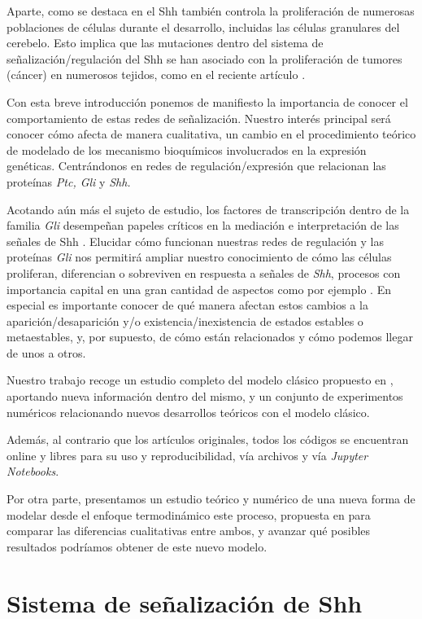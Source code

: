 Aparte, como se destaca en \cite{schaffer} el Shh también
controla la proliferación de numerosas poblaciones de células durante el desarrollo, incluidas las células granulares del cerebelo. Esto implica que las mutaciones dentro del sistema de señalización/regulación del Shh se han asociado con la proliferación de tumores (cáncer) en numerosos tejidos, como en el reciente artículo \cite{clement2007hedgehog}.

Con esta breve introducción ponemos de manifiesto la importancia de conocer el comportamiento de estas redes de señalización. Nuestro interés principal será conocer cómo afecta de manera cualitativa, un cambio en el procedimiento teórico de modelado de los mecanismo bioquímicos involucrados en la expresión genéticas. Centrándonos en redes de regulación/expresión que relacionan las proteínas\textit{ Ptc, Gli} y \textit{Shh.}

Acotando aún más el sujeto de estudio, los factores de transcripción dentro de la familia \textit{Gli} desempeñan papeles críticos en la mediación e interpretación de las señales de Shh \cite{i1999proteins}. Elucidar cómo funcionan nuestras redes de regulación y las proteínas \textit{Gli} nos permitirá ampliar nuestro conocimiento de cómo las células proliferan, diferencian o sobreviven en respuesta a señales de \textit{Shh}, procesos con importancia capital en una gran cantidad de aspectos como por ejemplo \cite{dahmane1997activation}. En especial es importante conocer de qué manera afectan estos cambios a la aparición/desaparición y/o existencia/inexistencia de estados estables o metaestables, y, por supuesto, de cómo están relacionados y cómo podemos llegar de unos a otros. 
 
 Nuestro trabajo recoge un estudio completo del modelo clásico propuesto en \cite{schaffer}, aportando nueva información dentro del mismo, y un conjunto de experimentos numéricos relacionando nuevos desarrollos teóricos con el modelo clásico. 
 
 Además, al contrario que los artículos originales, todos los códigos se encuentran online y libres para su uso y reproducibilidad, vía archivos y vía \textit{Jupyter Notebooks}.
 
 Por otra parte, presentamos un estudio teórico y numérico de una nueva forma de modelar desde el enfoque termodinámico este proceso, propuesta en \cite{multiple} para comparar las diferencias cualitativas entre ambos, y avanzar qué posibles resultados podríamos obtener de este nuevo modelo. 
 
 \section{Sistema de señalización de Shh}
 
